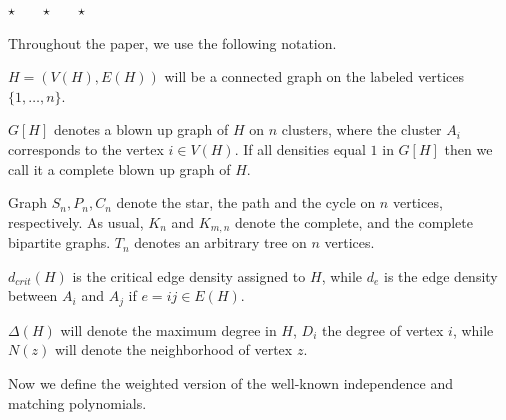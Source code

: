 \documentclass[12pt,a4paper]{amsart}
\numberwithin{equation}{section}
\begin{document}
\centerline{$\star$\ \ \ \ $\star$\ \ \ \ $\star$}
\bigskip

Throughout the paper, we use the following notation.

\begin{nota}

$H=(V(H), E(H))$ will be a connected graph on the labeled vertices $\{ 1,\dots
,n\}$.  

$G[H]$ denotes a blown up graph of $H$ on $n$ clusters, where the cluster
$A_i$ corresponds to the vertex $i\in V(H)$. If all densities equal $1$ in
$G[H]$ then we call it a complete blown up graph of $H$. 

Graph $S_n, P_n, C_n$ denote the star, the path and the cycle on $n$
vertices, respectively. As usual, $K_n$ and  $K_{m,n}$ denote the complete,
and the complete bipartite graphs. $T_n$ denotes an arbitrary tree on $n$
vertices. 

$d_{crit}(H)$ is the critical edge density assigned to $H$, while $d_e$ is the
edge density between $A_i$ and $A_j$ if $e=ij \in E(H)$. 

$\Delta (H)$ will denote the maximum degree in $H$, $D_i$ the degree of vertex
$i$, while $N(z)$ will denote the neighborhood of vertex $z$.   
\end{nota}

Now we define the weighted version of the well-known independence and matching
polynomials. 
\end{document}
